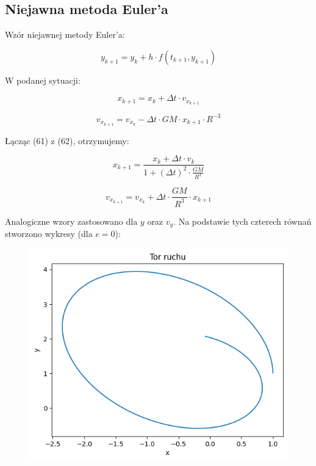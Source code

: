 \documentclass{article}
\begin{document}
	\newpage

	\subsection*{Niejawna metoda Euler'a}

	Wzór niejawnej metody Euler'a:

	\begin{equation}
		y_{k+1} = y_k + h \cdot f(t_{k+1}, y_{k+1})
	\end{equation}

	W podanej sytuacji:

	\begin{equation}
		x_{k+1} = x_k + \Delta t \cdot v_{x_{k+1}} 
	\end{equation}

	\begin{equation}
		v_{x_{k+1}} = v_{x_k} - \Delta t \cdot GM \cdot x_{k+1} \cdot R^{-3}
	\end{equation}

	Łącząc (61) z (62), otrzymujemy:

	\begin{equation}
		x_{k+1} = \frac{x_k + \Delta t \cdot v_k}{1+(\Delta t) ^ 2 \cdot \frac{GM}{R^3}}
	\end{equation}

	\begin{equation}
		v_{x_{k+1}} = v_{x_k} + \Delta t \cdot \frac{GM}{R^3} \cdot x_{k+1}
	\end{equation}

	

	Analogiczne wzory zastosowano dla $y$ oraz $v_y$. Na podstawie tych czterech równań stworzono wykresy (dla $e = 0$):

	\begin{figure}[h]
		\centering
		\includegraphics[scale = 0.7]{wykres3.png}
	\end{figure}
\end{document}
